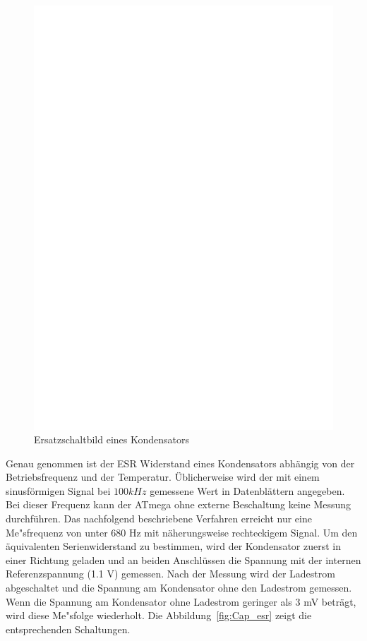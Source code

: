 \begin{figure}[H]
  \centering
    \includegraphics[]{../FIG/Cap_equiv.eps}
  \caption{Ersatzschaltbild eines Kondensators}
  \label{fig:Cap_equiv}
\end{figure}

Genau genommen ist der ESR Widerstand eines Kondensators abh\"angig von der Betriebsfrequenz und der Temperatur.
\"Ublicherweise wird der mit einem sinusf\"ormigen Signal bei \(100 kHz\) gemessene Wert in Datenbl\"attern angegeben.
Bei dieser Frequenz kann der ATmega ohne externe Beschaltung keine Messung durchf\"uhren.
Das nachfolgend beschriebene Verfahren erreicht nur eine Me"sfrequenz von unter 680 Hz mit n\"aherungsweise rechteckigem
Signal.
Um den \"aquivalenten Serienwiderstand zu bestimmen,
 wird der Kondensator zuerst in einer Richtung geladen und an beiden Anschl\"ussen die Spannung mit der internen
Referenzspannung (1.1 V) gemessen.
Nach der Messung wird der Ladestrom abgeschaltet und die Spannung am Kondensator ohne den
Ladestrom gemessen. Wenn die Spannung am Kondensator ohne Ladestrom geringer als 3 mV betr\"agt, wird
diese Me"sfolge wiederholt.
Die Abbildung~\ref{fig:Cap_esr} zeigt die entsprechenden Schaltungen.

